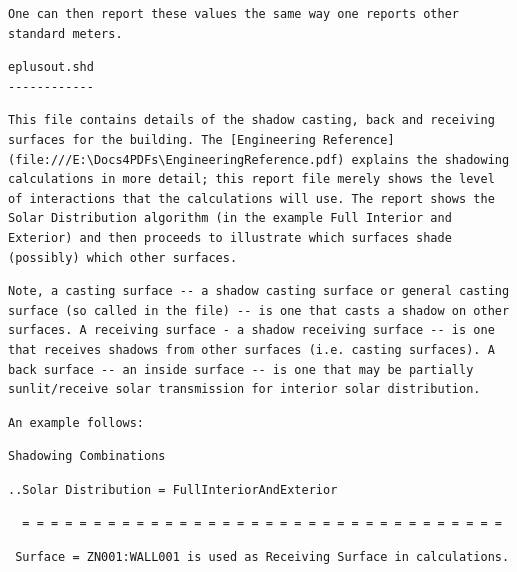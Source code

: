 \begin{lstlisting}
One can then report these values the same way one reports other standard meters.
\end{lstlisting}

\begin{lstlisting}
eplusout.shd
------------
\end{lstlisting}

\begin{lstlisting}
This file contains details of the shadow casting, back and receiving surfaces for the building. The [Engineering Reference](file:///E:\Docs4PDFs\EngineeringReference.pdf) explains the shadowing calculations in more detail; this report file merely shows the level of interactions that the calculations will use. The report shows the Solar Distribution algorithm (in the example Full Interior and Exterior) and then proceeds to illustrate which surfaces shade (possibly) which other surfaces.
\end{lstlisting}

\begin{lstlisting}
Note, a casting surface -- a shadow casting surface or general casting surface (so called in the file) -- is one that casts a shadow on other surfaces. A receiving surface - a shadow receiving surface -- is one that receives shadows from other surfaces (i.e. casting surfaces). A back surface -- an inside surface -- is one that may be partially sunlit/receive solar transmission for interior solar distribution.
\end{lstlisting}

\begin{lstlisting}
An example follows:
\end{lstlisting}

\begin{lstlisting}
Shadowing Combinations
\end{lstlisting}

\begin{lstlisting}
..Solar Distribution = FullInteriorAndExterior
\end{lstlisting}

\begin{lstlisting}
  = = = = = = = = = = = = = = = = = = = = = = = = = = = = = = = = = =
\end{lstlisting}

\begin{lstlisting}
 Surface = ZN001:WALL001 is used as Receiving Surface in calculations.
\end{lstlisting}

